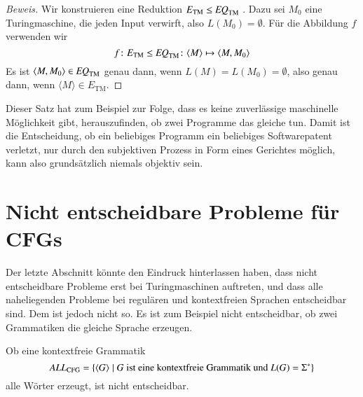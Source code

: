 \begin{proof}[Beweis]
Wir konstruieren eine Reduktion
$
E_{\text{TM}}\le \text{\it EQ}_{\text{TM}}
$
.
Dazu sei $M_0$ eine Turingmaschine, die jeden Input verwirft,
also $L(M_0)=\emptyset$.
Für die Abbildung $f$ verwenden wir
\[
f
\colon
E_{\text{TM}}\le \text{\it EQ}_{\text{TM}}
\colon
\langle M\rangle\mapsto \langle M,M_0\rangle
\]
Es ist $\langle M,M_0\rangle\in \text{\it EQ}_{\text{TM}}$
genau dann, wenn
$L(M)=L(M_0)=\emptyset$, also genau dann, wenn
$\langle M\rangle\in E_{\text{TM}}$.
\end{proof}

Dieser Satz hat zum Beispiel zur Folge, dass es keine zuverlässige
maschinelle
Möglichkeit gibt, herauszufinden, ob zwei Programme das gleiche tun.
Damit ist die Entscheidung, ob ein beliebiges Programm ein beliebiges
Softwarepatent verletzt, nur durch den subjektiven Prozess in Form
eines Gerichtes möglich, kann also grundsätzlich niemals objektiv sein.

\section{Nicht entscheidbare Probleme für CFGs}
Der letzte Abschnitt könnte den Eindruck hinterlassen haben,
dass nicht entscheidbare Probleme erst bei Turingmaschinen
auftreten, und dass alle naheliegenden Probleme bei regulären
und kontextfreien Sprachen entscheidbar sind.
Dem ist jedoch nicht so.
Es ist zum Beispiel nicht entscheidbar, ob zwei
Grammatiken die gleiche Sprache erzeugen.

\begin{satz} Ob eine kontextfreie Grammatik
\[
\text{\it ALL}_{\text{CFG}}=\{\langle G\rangle\;|\; \text{$G$
ist eine kontextfreie Grammatik und $L(G)=\Sigma^*$}\}
\]
%
alle Wörter erzeugt, ist nicht entscheidbar.
\end{satz}

